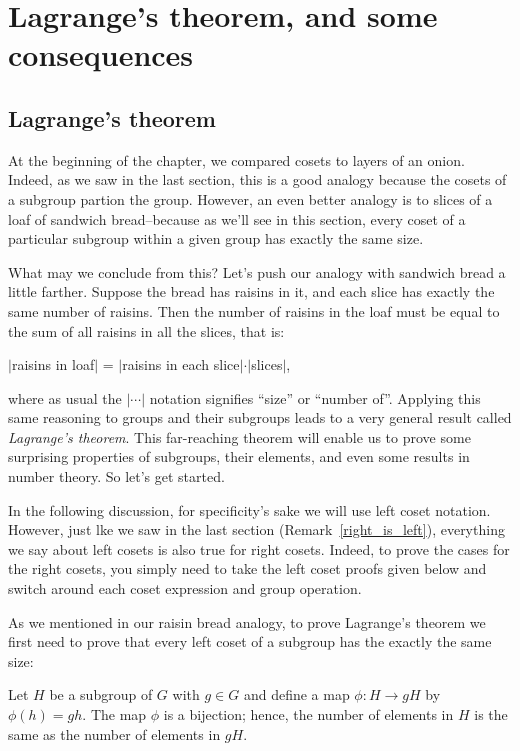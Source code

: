 \section{Lagrange's theorem, and some consequences}\label{sec:LagThm}

\subsection{Lagrange's theorem}
At the beginning of the chapter, we compared cosets to layers of an onion.  Indeed, as we saw in the last section, this is a good analogy because the cosets of a subgroup partion the group.  However, an even better analogy is to slices of a loaf of sandwich bread--because as we'll see in this section, every coset of a particular subgroup within a given group has exactly the same size. 

What may we conclude from this? Let's push our analogy with sandwich bread a little farther. Suppose the bread has raisins in it, and each slice has exactly the same number of raisins. Then the number of raisins in the loaf must be equal to the sum of all raisins in all the slices, that is:


$|$raisins in loaf$|$ = $|$raisins in each slice$| \cdot |$slices$|$,

\noindent
where as usual the $| \cdots |$ notation  signifies ``size'' or ``number of''.
Applying this same reasoning to groups and their subgroups leads to a very general result called \emph{Lagrange's theorem}.  This far-reaching theorem will enable us to prove some surprising  properties of subgroups, their elements, and even some results in number theory.  So let's get started.  

\begin{rem}\label{left_is_right}
In the following discussion, for specificity's sake we will use  left coset notation. However, just lke we saw in the last section (Remark~\ref{right_is_left}), everything we say about left cosets is also true for right cosets. Indeed, to prove the cases for the right cosets, you simply need to take the left coset proofs given below and switch around each coset expression and group operation.
\end{rem}

As we mentioned in our raisin bread analogy, to prove  Lagrange's theorem we first need to prove that every left coset of a subgroup has the exactly the same size:

\begin{thm}\label{cosets_theorem_4}
Let $H$ be a subgroup of $G$ with $g \in G$ and define a map $\phi:H \rightarrow gH$ by $\phi(h) = gh$.  The map $\phi$ is a bijection; hence, the number of elements in $H$ is the same as the number of elements in $gH$. 
\end{thm}
 
